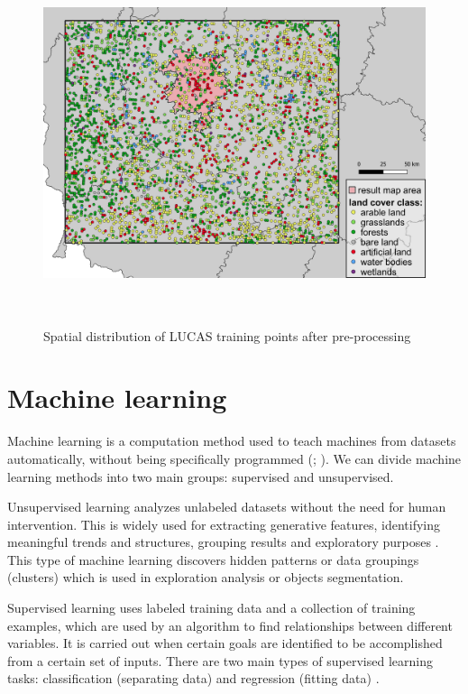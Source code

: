 \documentclass{amuthesis}
\begin{document}
\begin{figure}[H]

{\centering \includegraphics[width=5.875in,height=4.16667in]{./figures/lucas_distribution.png}

}

\caption{\label{fig-rycina4}Spatial distribution of LUCAS training
points after pre-processing}

\end{figure}

\hypertarget{sec-ml}{%
\section{Machine learning}\label{sec-ml}}

Machine learning is a computation method used to teach machines from
datasets automatically, without being specifically programmed
(\textcite{mahesh_machine_2018}; \textcite{sarker_machine_2021}). We can
divide machine learning methods into two main groups: supervised and
unsupervised.

Unsupervised learning analyzes unlabeled datasets without the need for
human intervention. This is widely used for extracting generative
features, identifying meaningful trends and structures, grouping results
and exploratory purposes \autocite{sarker_machine_2021}. This type of
machine learning discovers hidden patterns or data groupings (clusters)
which is used in exploration analysis or objects segmentation.

Supervised learning uses labeled training data and a collection of
training examples, which are used by an algorithm to find relationships
between different variables. It is carried out when certain goals are
identified to be accomplished from a certain set of inputs. There are
two main types of supervised learning tasks: classification (separating
data) and regression (fitting data) \autocite{sarker_machine_2021}.
\end{document}
